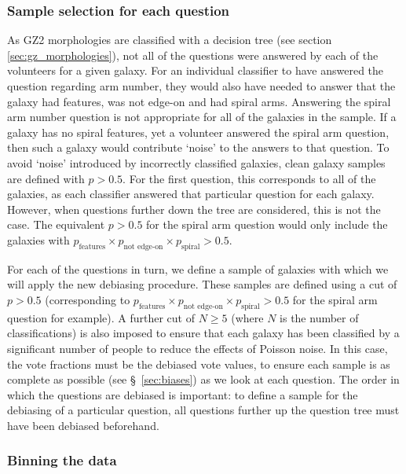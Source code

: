 \documentclass[useAMS,usenatbib]{mn2e}
\begin{document}
\subsubsection{Sample selection for each question}
\label{sec:sample_selection_per_question}

As GZ2 morphologies are classified with a decision tree (see section \ref{sec:gz_morphologies}), not all of the questions were answered by each of the volunteers for a given galaxy. For an individual classifier to have answered the question regarding arm number, they would also have needed to answer that the galaxy had features, was not edge-on and had spiral arms. Answering the spiral arm number question is not appropriate for all of the galaxies in the sample. If a galaxy has no spiral features, yet a volunteer answered the spiral arm question, then such a galaxy would contribute `noise' to the answers to that question. To avoid `noise' introduced by incorrectly classified galaxies, clean galaxy samples are defined with $p > 0.5$. For the first question, this corresponds to all of the galaxies, as each classifier answered that particular question for each galaxy. However, when questions further down the tree are considered, this is not the case. The equivalent $p>0.5$ for the spiral arm question would only include the galaxies with $p_{\textrm{features}} \times p_{\textrm{not edge-on}} \times p_{\textrm{spiral}} > 0.5$. 

For each of the questions in turn, we define a sample of galaxies with which we will apply the new debiasing procedure. These samples are defined using a cut of $p>0.5$ (corresponding to $p_{\textrm{features}} \times p_{\textrm{not edge-on}} \times p_{\textrm{spiral}} > 0.5$ for the spiral arm question for example). A further cut of $N \geq 5$ (where $N$ is the number of classifications) is also imposed to ensure that each galaxy has been classified by a significant number of people to reduce the effects of Poisson noise. In this case, the vote fractions must be the debiased vote values, to ensure each sample is as complete as possible (see \S~\ref{sec:biases}) as we look at each question. The order in which the questions are debiased is important: to define a sample for the debiasing of a particular question, all questions further up the question tree must have been debiased beforehand.
\subsubsection{Binning the data}
\label{sec:binning}
\end{document}
